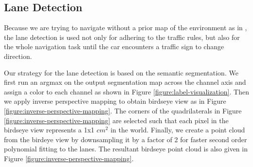 \subsection{Lane Detection}

Because we are trying to navigate without a prior map of the environment as in
\cite{Meyer2018DeepSL}, the lane detection is used not only for adhering to the
traffic rules, but also for the whole navigation task until the car encounters
a traffic sign to change direction.

Our strategy for the lane detection is based on the semantic segmentation. We
first run an argmax on the output segmentation map across the channel axis and
assign a color to each channel as shown in Figure
\ref{figure:label-visualization}. Then we apply inverse perspective mapping to
obtain birdseye view as in Figure \ref{figure:inverse-perspective-mapping}.
The corners of the quadrilaterals in Figure
\ref{figure:inverse-perspective-mapping} are selected such that each pixel in
the birdseye view represents a 1x1 $cm^2$ in the world. Finally, we create a
point cloud from the birdeye view by downsampling it by a factor of 2 for
faster second order polynomial fitting to the lanes. The resultant birdseye
point cloud is also given in Figure \ref{figure:inverse-perspective-mapping}.

